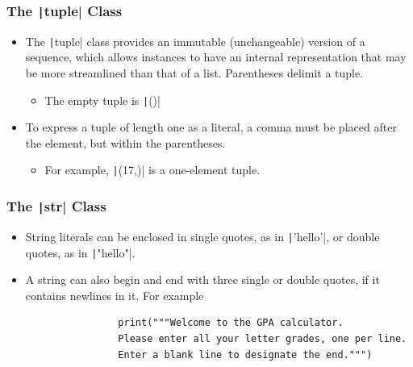 \begin{frame}
    \frametitle{The \texttt|tuple| Class}

    \begin{itemize}
        \item The \texttt|tuple| class provides an immutable (unchangeable) version of a sequence, which allows instances to have an internal representation that may be more streamlined than that of a list. Parentheses delimit a tuple.
              \begin{itemize}
                  \item The empty tuple is \texttt|()|
              \end{itemize}
        \item To express a tuple of length one as a literal, a comma must be placed after the element, but within the parentheses.
              \begin{itemize}
                  \item For example, \texttt|(17,)| is a one-element tuple.
              \end{itemize}

    \end{itemize}

\end{frame}

\begin{frame}[fragile]
    \frametitle{The \texttt|str| Class}

    \begin{itemize}
        \item String literals can be enclosed in single quotes, as in \texttt|'hello'|, or double quotes, as in \texttt|"hello"|.
        \item A string can also begin and end with three single or double quotes, if it contains newlines in it. For example
              \vspace{\baselineskip}
              \begin{verbatim}
                print("""Welcome to the GPA calculator.
                Please enter all your letter grades, one per line.
                Enter a blank line to designate the end.""")
              \end{verbatim}
    \end{itemize}
\end{frame}

